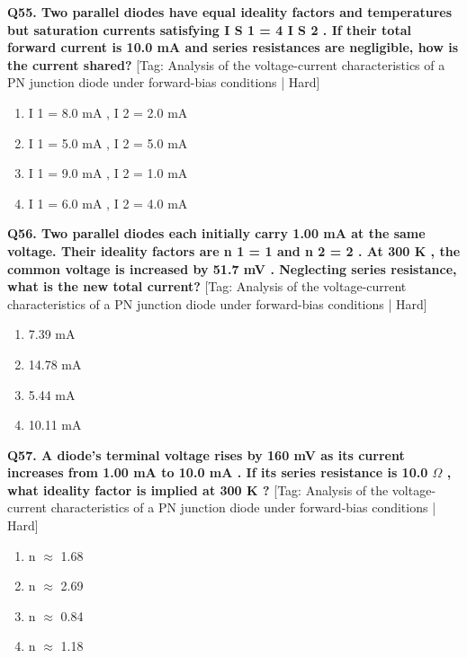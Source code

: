 \noindent\textbf{Q55. Two parallel diodes have equal ideality factors and temperatures but saturation currents satisfying I S 1 = 4 I S 2 . If their total forward current is 10.0 mA and series resistances are negligible, how is the current shared?} \hfill [Tag: Analysis of the voltage-current characteristics of a PN junction diode under forward-bias conditions | Hard]
\begin{enumerate}[label=(\alph*),topsep=2pt,itemsep=1pt,partopsep=0pt,parsep=0pt]
    \item {I 1 = 8.0 mA , I 2 = 2.0 mA}
    \item {I 1 = 5.0 mA , I 2 = 5.0 mA}
    \item {I 1 = 9.0 mA , I 2 = 1.0 mA}
    \item {I 1 = 6.0 mA , I 2 = 4.0 mA}
\end{enumerate}
\vspace{2mm}

\noindent\textbf{Q56. Two parallel diodes each initially carry 1.00 mA at the same voltage. Their ideality factors are n 1 = 1 and n 2 = 2 . At 300 K , the common voltage is increased by 51.7 mV . Neglecting series resistance, what is the new total current?} \hfill [Tag: Analysis of the voltage-current characteristics of a PN junction diode under forward-bias conditions | Hard]
\begin{enumerate}[label=(\alph*),topsep=2pt,itemsep=1pt,partopsep=0pt,parsep=0pt]
    \item {7.39 mA}
    \item {14.78 mA}
    \item {5.44 mA}
    \item {10.11 mA}
\end{enumerate}
\vspace{2mm}

\noindent\textbf{Q57. A diode's terminal voltage rises by 160 mV as its current increases from 1.00 mA to 10.0 mA . If its series resistance is 10.0 $\Omega$ , what ideality factor is implied at 300 K ?} \hfill [Tag: Analysis of the voltage-current characteristics of a PN junction diode under forward-bias conditions | Hard]
\begin{enumerate}[label=(\alph*),topsep=2pt,itemsep=1pt,partopsep=0pt,parsep=0pt]
    \item {n $\approx$ 1.68}
    \item {n $\approx$ 2.69}
    \item {n $\approx$ 0.84}
    \item {n $\approx$ 1.18}
\end{enumerate}
\vspace{2mm}

